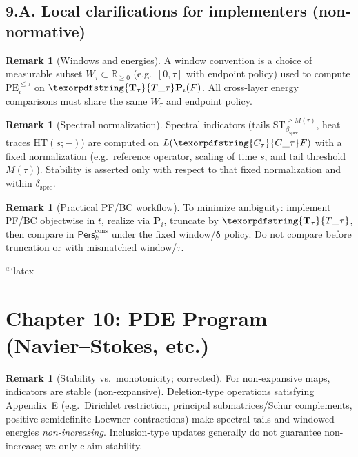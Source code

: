 \documentclass[11pt]{article}
\DeclareRobustCommand{\hyp}{\nobreakdash-}
\newcommand{\Pers}{\mathsf{Pers}}
\numberwithin{equation}{section}
\theoremstyle{definition}
\newtheorem{remark}[theorem]{Remark}
\DeclareRobustCommand{\Perskft}{\Pers^{\mathrm{cons}}_{k}}
\DeclareRobustCommand{\Ttau}{\texorpdfstring{\ensuremath{\mathbf{T}_{\tau}}}{T\_\tau}}
\DeclareRobustCommand{\Ctau}{\texorpdfstring{\ensuremath{C_{\tau}}}{C\_\tau}}
\begin{document}
\subsection*{9.A. Local clarifications for implementers (non-normative)}
\begin{remark}[Windows and energies]\label{rk:9-windows}
A window convention is a choice of measurable subset \(W_\tau\subset\mathbb{R}_{\ge 0}\) (e.g.\ \([0,\tau]\) with endpoint policy) used to compute \(\mathrm{PE}_i^{\le\tau}\) on \(\Ttau\mathbf{P}_i(F)\).
All cross\hyp layer energy comparisons must share the same \(W_\tau\) and endpoint policy.
\end{remark}

\begin{remark}[Spectral normalization]\label{rk:9-spec-norm}
Spectral indicators (tails \(\mathrm{ST}_{\beta_{\mathrm{spec}}}^{\ge M(\tau)}\), heat traces \(\mathrm{HT}(s;{-})\)) are computed on \(L(\Ctau F)\) with a fixed normalization (e.g.\ reference operator, scaling of time \(s\), and tail threshold \(M(\tau)\)).
Stability is asserted only with respect to that fixed normalization and within \(\delta_{\mathrm{spec}}\).
\end{remark}

\begin{remark}[Practical PF/BC workflow]\label{rk:9-pfbc-workflow}
To minimize ambiguity: implement PF/BC objectwise in \(t\), realize via \(\mathbf{P}_i\), truncate by \(\Ttau\), then compare in \(\Perskft\) under the fixed window/\(\boldsymbol{\delta}\) policy.
Do not compare before truncation or with mismatched window/\(\tau\).
\end{remark}



```latex
\section{Chapter 10: PDE Program (Navier--Stokes, etc.)}

\begin{remark}[Stability vs.\ monotonicity; corrected]
For non\hyp expansive maps, indicators are stable (non\hyp expansive).
Deletion\hyp type operations satisfying Appendix~E (e.g.\ Dirichlet restriction, principal submatrices/Schur complements, positive\hyp semidefinite Loewner contractions)
make spectral tails and windowed energies \emph{non\hyp increasing}.
Inclusion\hyp type updates generally do not guarantee non\hyp increase; we only claim stability.
\end{remark}
\end{document}
